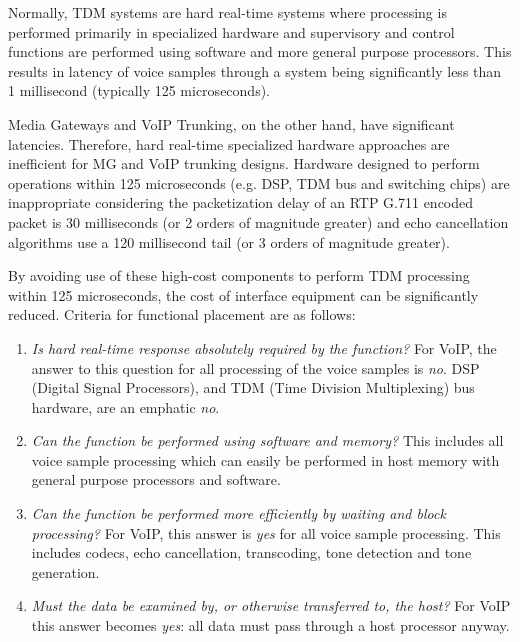 \documentclass[letterpaper,final,notitlepage,twocolumn,10pt,twoside]{article}
\begin{document}
Normally, TDM systems are hard real-time systems where processing is performed
primarily in specialized hardware and supervisory and control functions are
performed using software and more general purpose processors.  This results in
latency of voice samples through a system being significantly less than 1
millisecond (typically 125 microseconds).

Media Gateways and VoIP Trunking, on the other hand, have significant latencies.
Therefore, hard real-time specialized hardware approaches are inefficient for
MG and VoIP trunking designs.  Hardware designed to perform operations within
125 microseconds (e.g. DSP, TDM bus and switching chips) are inappropriate
considering the packetization delay of an RTP G.711 encoded packet is 30
milliseconds (or 2 orders of magnitude greater) and echo cancellation algorithms
use a 120 millisecond tail (or 3 orders of magnitude greater).

By avoiding use of these high-cost components to perform TDM processing within
125 microseconds, the cost of interface equipment can be significantly reduced.
Criteria for functional placement are as follows:

\begin{enumerate}
\item \textsl{Is hard real-time response absolutely required by the function?}
	For VoIP, the answer to this question for all processing of the voice
	samples is \textit{no}.  DSP (Digital Signal Processors), and TDM (Time
	Division Multiplexing) bus hardware, are an emphatic \textit{no}.
\item \textsl{Can the function be performed using software and memory?}
	This includes all voice sample processing which can easily be performed
	in host memory with general purpose processors and software.
\item \textsl{Can the function be performed more efficiently by waiting and block
processing?}
	For VoIP, this answer is \textit{yes} for all voice sample processing.
	This includes codecs, echo cancellation, transcoding, tone detection and
	tone generation.
\item \textsl{Must the data be examined by, or otherwise transferred to, the host?}
	For VoIP this answer becomes \textit{yes}: all data must pass through
	a host processor anyway.
\end{enumerate}
\end{document}
